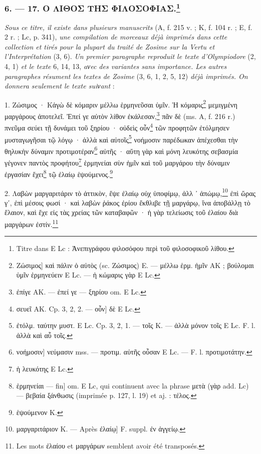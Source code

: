 \documentclass[a4paper, 11pt, oneside, polutonikogreek, french]{article}
\begin{document}
\bigskip
\centerline{\EightStarTaper}
\centerline{\EightStarTaper\EightStarTaper}
\bigskip

\subsubsection[6. --- 17. Ο ΛΙΘΟΣ ΤΗΣ ΦΙΛΟΣΟΦΙΑΣ.]{6. --- 17. Ο ΛΙΘΟΣ ΤΗΣ ΦΙΛΟΣΟΦΙΑΣ.\footnote{Titre dans E Lc : Ἀνεπιγράφου φιλοσόφου περὶ τοῦ φιλοσοφικοῦ λίθου.}}

\emph{Sous ce titre, il existe dans plusieurs manuscrits} (A, f. 215 v. ; K, f. 104 r. ; E, f. 2 r. ; Lc, p. 341), \emph{une compilation de morceaux déjà imprimés dans cette collection et tirés pour la plupart du traité de Zosime sur la Vertu et l'Interprétation} (3, 6). \emph{Un premier paragraphe reproduit le texte d'Olympiodore} (2, 4, 1) \emph{et le texte} 6, 14, 13, \emph{aνec des variantes sans importance. Les autres paragraphes résument les textes de Zosime} (3, 6, 1, 2, 5, 12) \emph{déjà imprimés. On donnera seulement le texte suiνant} :

\bigskip

1. Ζώσιμος · Κἀγὼ δὲ κόμαριν μέλλω ἑρμηνεῦσαι ὑμῖν. Ἡ κόμαρις\footnote{Ζώσιμος] καὶ πάλιν ὁ αὐτὸς (sc. Ζώσιμος) E. --- μέλλω ἑρμ. ἡμῖν AK ; βούλομαι ὑμῖν ἑρμηνεύειν E Lc. --- ἡ κώμαρις γὰρ E Lc.} μεμιγμένη μαργάρους ἀποτελεῖ. Ἐπεί γε αὐτὸν λίθον ἐκάλεσαν,\footnote{ἐπίγε AK. --- ἐπεί γε --- ξηρίου om. E Lc.} πᾶν δὲ (ms. Α, f. 216 r.) πνεῦμα σεύει τῇ δυνάμει τοῦ ξηρίου · οὐδεὶς οὖν\footnote{σευεῖ AK. Cp. 3, 2, 2. --- οὖν] δὲ E Lc.} τῶν προφητῶν ἐτόλμησεν μυσταγωγῆσαι τῷ λόγῳ · ἀλλὰ καὶ αὐτοῖς\footnote{ἐτόλμ. ταύτην μυστ. E Lc. Cp. 3, 2, 1. --- τοῖς K. --- ἀλλὰ μόνον τοῖς E Lc. F. l. ἀλλὰ καὶ αὖ τοῖς.} νοήμοσιν παρέδωκαν ἀπέχεσθαι τὴν θηλυκὴν δύναμιν προτιμοτέραν\footnote{νοήμοσιν] νεύμασιν mss. --- προτιμ. αὐτῆς οὖσαν E Lc. --- F. l. προτιμοτάτην.} αὐτῆς · αὕτη γὰρ καὶ μόνη λευκότης σεβασμία γέγονεν παντὸς προφήτου\footnote{ἡ λευκότης E Lc.} ἑρμηνείαι σὺν ἡμῖν καὶ τοῦ μαργάρου τὴν δύναμιν ἐργασίαν ἔχει\footnote{ἑρμηνείαι --- fin] om. E Lc, qui continuent avec la phrase μετὰ (γὰρ add. Lc) --- βεβαία ξάνθωσις (imprimée p. 127, l. 19) et aj. : τέλος.} τῷ ἐλαίῳ ἑψούμενος.\footnote{ἑψούμενον K.}

2. Λαβὼν μαργαριτάριν τὸ ἀττικὸν, ἕψε ἐλαίῳ οὐχ ὑποφίμῳ, ἀλλ ᾽ ἀπώμῳ,\footnote{μαργαριτάριον K. --- Après ἐλαίῳ] F. suppl. ἐν ἀγγείῳ.} ἐπὶ ὥρας γʹ, ἐπὶ μέσοις φωσί · καὶ λαβὼν ῥάκος ἐρίου ἔκθλιβε τῇ μαργάρῳ, ἵνα ἀποβάλλῃ τὸ ἔλαιον, καὶ ἔχε εἰς τὰς χρείας τῶν καταβαφῶν · ἡ γὰρ τελείωσις τοῦ ἐλαίου διὰ μαργάρων ἐστίν.\footnote{Les mots ἐλαίου et μαργάρων semblent avoir été transposés.}
\end{document}
